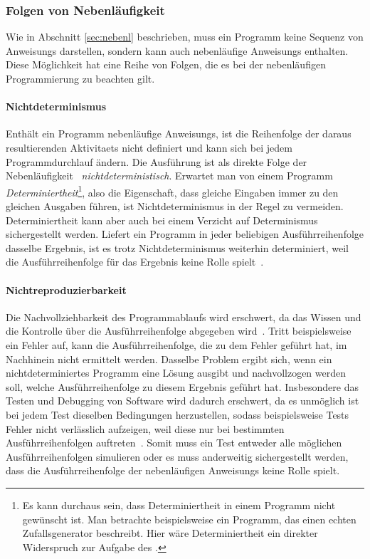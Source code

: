 \subsubsection{Folgen von Nebenläufigkeit}\label{sec:nebenl-folgen}
Wie in Abschnitt \ref{sec:nebenl} beschrieben, muss ein \gls{Programm} keine Sequenz von \glspl{Anweisung} darstellen, sondern kann auch nebenläufige \glspl{Anweisung} enthalten. Diese Möglichkeit hat eine Reihe von Folgen, die es bei der nebenläufigen Programmierung zu beachten gilt.
\paragraph{Nichtdeterminismus}
Enthält ein \gls{Programm} nebenläufige \glspl{Anweisung}, ist die Reihenfolge der daraus resultierenden \glspl{Aktivitaet} nicht definiert und kann sich bei jedem Programmdurchlauf ändern. Die Ausführung ist als direkte Folge der Nebenläufigkeit~\cite[S.~17~\psq]{Herrtwich1989} \emph{nichtdeterministisch}. Erwartet man von einem \gls{Programm} \emph{Determiniertheit}\footnote{Es kann durchaus sein, dass Determiniertheit in einem \gls{Programm} nicht gewünscht ist. Man betrachte beispielsweise ein \gls{Programm}, das einen echten Zufallsgenerator beschreibt. Hier wäre Determiniertheit ein direkter Widerspruch zur Aufgabe des .}, also die Eigenschaft, dass gleiche Eingaben immer zu den gleichen Ausgaben führen, ist Nichtdeterminismus in der Regel zu vermeiden. Determiniertheit kann aber auch bei einem Verzicht auf Determinismus sichergestellt werden. Liefert ein \gls{Programm} in jeder beliebigen Ausführreihenfolge dasselbe Ergebnis, ist es trotz Nichtdeterminismus weiterhin determiniert, weil die Ausführreihenfolge für das Ergebnis keine Rolle spielt~\cite[S.~18~\psq]{Herrtwich1989}. 
\paragraph{Nichtreproduzierbarkeit}
Die Nachvollziehbarkeit des Programmablaufs wird erschwert, da das Wissen und die Kontrolle über die Ausführreihenfolge abgegeben wird~\cite[S.~20]{Herrtwich1989}. Tritt beispielsweise ein Fehler auf, kann die Ausführreihenfolge, die zu dem Fehler geführt hat, im Nachhinein nicht ermittelt werden. Dasselbe Problem ergibt sich, wenn ein nichtdeterminiertes \gls{Programm} eine Lösung ausgibt und nachvollzogen werden soll, welche Ausführreihenfolge zu diesem Ergebnis geführt hat. Insbesondere das Testen und Debugging von Software wird dadurch erschwert, da es unmöglich ist bei jedem Test dieselben Bedingungen herzustellen, sodass beispielsweise Tests Fehler nicht verlässlich aufzeigen, weil diese nur bei bestimmten Ausführreihenfolgen auftreten~\cite[S.~20]{Herrtwich1989}. Somit muss ein Test entweder alle möglichen Ausführreihenfolgen simulieren oder es muss anderweitig sichergestellt werden, dass die Ausführreihenfolge der nebenläufigen \glspl{Anweisung} keine Rolle spielt.

